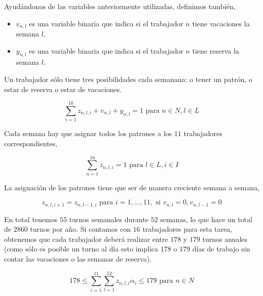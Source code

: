 \documentclass[a4paper,12pt]{article}
\begin{document}
Ayud\'andonos de las variables anteriormente utilizadas, definimos tambi\'en,\\

\begin{itemize}
\item[] $v_{n,l}$ es una variable binaria que indica si el trabajador $n$ tiene vacaciones la semana $l$,\\
\item[] $y_{n,l}$ es una variable binaria que indica si el trabajador $n$ tiene reserva la semana $l$.\\
\end{itemize}

Un trabajador s\'olo tiene tres posibilidades cada semanana: o tener un patr\'on, o estar de reserva o estar de vacaciones.

$$ \sum_{i=1}^{16} z_{n,l,i} + v_{n,l} + y_{n,l} = 1 \text{ para } n\in N, l\in L$$ 


Cada semana hay que asignar todos los patrones a los $11$ trabajadores correspondientes,

$$ \sum_{n=1}^{16} z_{n,l,i} = 1 \text{ para } l\in L, i\in I$$

La asignaci\'on de los patrones tiene que ser de manera creciente semana a semana,

$$ z_{n,l,i+1} = z_{n,l-1,i} \text{ para } i=1,\dots,11, \text{ si } v_{n,l} = 0, v_{n,l-1} = 0$$


En total tenemos $55$ turnos semanales durante $52$ semanas, lo que hace un total de $2860$ turnos por a\~no. Si contamos con $16$ trabajadores para esta tarea, obtenemos que cada trabajador deber\'a realizar entre $178$ y $179$ turnos anuales (como s\'olo es posible un turno al d\'ia esto implica $178$ o $179$ d\'ias de trabajo sin contar las vacaciones o las semanas de reserva). 

$$ 178 \leq \sum_{i=1}^{11} \sum_{l=1}^{52} z_{n,l,i} \alpha_{i} \leq 179 \text{ para } n\in N $$
\end{document}
